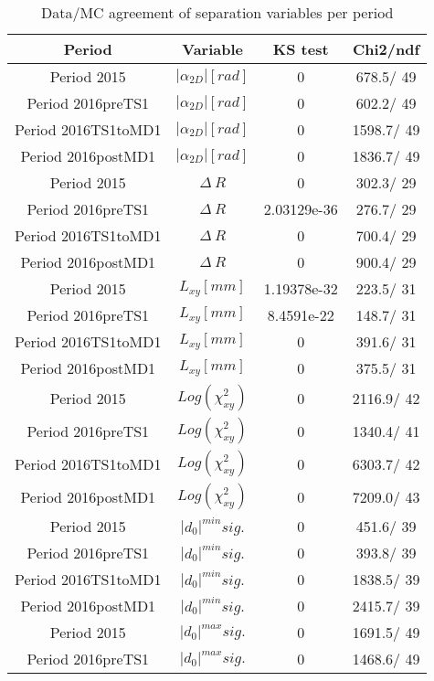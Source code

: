 \documentclass{article}
\begin{document}
\begin{longtable}{c|c|c|c}
\caption{\label{tab:sepVarsandSepPeriods}Data/MC agreement of separation variables per period}\\
Period & Variable & KS test & Chi2/ndf \\
\hline
 Period 2015 & $|\alpha_{2D}| [rad]$ & 0 & 678.5/ 49\\
\hline
 Period 2016preTS1 & $|\alpha_{2D}| [rad]$ & 0 & 602.2/ 49\\
\hline
 Period 2016TS1toMD1 & $|\alpha_{2D}| [rad]$ & 0 & 1598.7/ 49\\
\hline
 Period 2016postMD1 & $|\alpha_{2D}| [rad]$ & 0 & 1836.7/ 49\\
\hline
 Period 2015 & $\Delta~R$ & 0 & 302.3/ 29\\
\hline
 Period 2016preTS1 & $\Delta~R$ & 2.03129e-36 & 276.7/ 29\\
\hline
 Period 2016TS1toMD1 & $\Delta~R$ & 0 & 700.4/ 29\\
\hline
 Period 2016postMD1 & $\Delta~R$ & 0 & 900.4/ 29\\
\hline
 Period 2015 & $L_{xy} [mm]$ & 1.19378e-32 & 223.5/ 31\\
\hline
 Period 2016preTS1 & $L_{xy} [mm]$ & 8.4591e-22 & 148.7/ 31\\
\hline
 Period 2016TS1toMD1 & $L_{xy} [mm]$ & 0 & 391.6/ 31\\
\hline
 Period 2016postMD1 & $L_{xy} [mm]$ & 0 & 375.5/ 31\\
\hline
 Period 2015 & $Log(\chi^{2}_{xy})$ & 0 & 2116.9/ 42\\
\hline
 Period 2016preTS1 & $Log(\chi^{2}_{xy})$ & 0 & 1340.4/ 41\\
\hline
 Period 2016TS1toMD1 & $Log(\chi^{2}_{xy})$ & 0 & 6303.7/ 42\\
\hline
 Period 2016postMD1 & $Log(\chi^{2}_{xy})$ & 0 & 7209.0/ 43\\
\hline
 Period 2015 & $|d_{0}|^{min} sig.$ & 0 & 451.6/ 39\\
\hline
 Period 2016preTS1 & $|d_{0}|^{min} sig.$ & 0 & 393.8/ 39\\
\hline
 Period 2016TS1toMD1 & $|d_{0}|^{min} sig.$ & 0 & 1838.5/ 39\\
\hline
 Period 2016postMD1 & $|d_{0}|^{min} sig.$ & 0 & 2415.7/ 39\\
\hline
 Period 2015 & $|d_{0}|^{max} sig.$ & 0 & 1691.5/ 49\\
\hline
 Period 2016preTS1 & $|d_{0}|^{max} sig.$ & 0 & 1468.6/ 49\\
\hline

\end{longtable}
\end{document}

